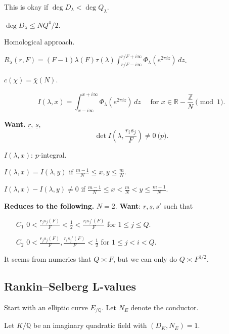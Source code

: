 \documentclass[reqno]{amsart} 
\begin{document}
This is okay if $\deg D_\lambda < \deg Q_\lambda$.

$\deg D_\lambda \leq N Q^4/2$.

Homological approach.

$R_\lambda(r, F) =(F - 1) \lambda(F) \tau(\lambda) \int_{r/F - i \infty}^{r/F + i \infty} \Phi_\lambda \left( e^{2 \pi i z} \right) \, d z$.

$c(\chi) = \bar{\chi}(N)$.

\begin{equation*}
  I(\lambda, x) = \int_{x - i \infty}^{x + i \infty}
  \Phi_\lambda(e^{2 \pi i z}) \, d z
  \quad \text{ for } x \in \mathbb{R} - \frac{\mathbb{Z}}{N} \pmod{1}.
\end{equation*}

\textbf{Want.} $\underline{r}$, $\underline{s}$,
\begin{equation*}
\det I \left( \lambda, \frac{r_i s_j}{F} \right) \neq 0 \pod{p}.
\end{equation*}

$I(\lambda, x)$: $p$-integral.

$I(\lambda, x) = I(\lambda, y)$ if $\frac{m - 1}{N} \leq x, y \leq \frac{m}{N}$.

$I(\lambda, x) - I(\lambda, y) \neq 0$ if $\frac{m - 1}{N} \leq x < \frac{m}{N} < y \leq \frac{m + 1}{N}$.

\textbf{Reduces to the following.}
$N = 2$.  \textbf{Want}: $\underline{r}, \underline{s}, \underline{s'}$ such that
\begin{enumerate}
\item[$C_1$] $0 < \frac{r_j s_j(F) }{F} < \frac{1}{2} < \frac{r_i s_j '(F) }{F}$ for $1 \leq j \leq Q$.
\item[$C_2$] $0 < \frac{r_j s_j(F) }{F}, \frac{r_i s_j '(F) }{F} < \frac{1}{2}$ for $1 \leq j < i < Q$.
\end{enumerate}

\begin{remark}\label{remark:cnfg5j6hsm}
  It seems from numerics that $Q \asymp F$, but we can only do $Q \asymp F^{1/2}$.
\end{remark}

\subsection{Rankin--Selberg L-values}
Start with an elliptic curve $E_{/\mathbb{Q}}$.  Let $N_E$ denote the conductor.

Let $K/\mathbb{Q}$ be an imaginary quadratic field with $(D_K, N_E) = 1$.
\end{document}
